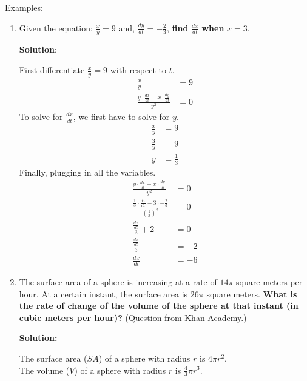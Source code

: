 \documentclass[12pt]{article}
\begin{document}
            \noindent Examples:
            \begin{enumerate}
                \item Given the equation: $\frac{x}{y} = 9$ and, $\frac{dy}{dt} = -\frac{2}{3}$, \textbf{find} $\frac{dx}{dt}$ \textbf{when} $x=3$.

                \noindent \textbf{Solution}:

                \noindent First differentiate $\frac{x}{y} = 9$ with respect to $t$.
                \begin{align*}
                    \frac{x}{y} &= 9 \\[6pt]
                    \frac{y \cdot \frac{dx}{dt} - x \cdot \frac{dy}{dt}}{y^2} &= 0
                \end{align*}
                To solve for $\frac{dx}{dt}$, we first have to solve for $y$.
                \begin{align*}
                    \frac{x}{y} &= 9 \\[6pt]
                    \frac{3}{y} &= 9 \\[6pt]
                    y &= \frac{1}{3}
                \end{align*}
                Finally, plugging in all the variables.
                \begin{align*}
                    \frac{y \cdot \frac{dx}{dt} - x \cdot \frac{dy}{dt}}{y^2} &= 0 \\[6pt]
                    \frac{\frac{1}{3} \cdot \frac{dx}{dt} - 3 \cdot -\frac{2}{3}}{\left( \frac{1}{3} \right)^2} &= 0 \\[6pt]
                    \frac{\frac{dx}{dt} }{3} + 2 &= 0 \\[6pt]
                    \frac{\frac{dx}{dt}}{3} &= -2 \\[6pt]
                    \frac{dx}{dt} &= -6
                \end{align*}
                \smallskip

                \item The surface area of a sphere is increasing at a rate of $14 \pi$ square meters per hour. At a certain instant, the surface area is $26 \pi$ square meters. \textbf{What is the rate of change of the volume of the sphere at that instant (in cubic meters per hour)?} (Question from Khan Academy.)

                \noindent \textbf{Solution:}

                \noindent The surface area ($SA$) of a sphere with radius $r$ is $4 \pi r^2$.
                \\ The volume ($V$) of a sphere with radius $r$ is $\frac{4}{3} \pi r^3$.


\end{enumerate}
\end{document}
